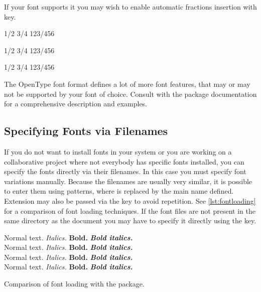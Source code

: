 If your font supports it you may wish to enable automatic fractions insertion
with  key.
\begin{example}
1/2 3/4 123/456

\setmainfont[
  Fractions=On,
]{Latin Modern Roman}
1/2 3/4 123/456

\setmainfont[
  Fractions=On,
]{Source Serif Pro}
1/2 3/4 123/456
\end{example}

The OpenType font format defines a lot of more font features, that may or may not
be supported by your font of choice. Consult with the  package
documentation for a comprehensive description and examples.

\subsection{Specifying Fonts via Filenames}\label{ssec:fonts_filename}

If you do not want to install fonts in your system or you are working on a
collaborative project where not everybody has specific fonts installed, you can
specify the fonts directly via their filenames. In this case you must specify
font variations manually. Because the filenames are usually very similar, it is
possible to enter them using \cargv{*} patterns, where \cargv{*} is replaced by
the main name defined. Extension may also be passed via the 
key to avoid repetition. See \autoref{lst:fontloading} for a comparison of font
loading techniques. If the font files are not present in the same directory as
the document you may have to specify it directly using the  key.
\begin{listing}
  \begin{example}[vertical_mode, examplewidth=0.8\linewidth]
\setmainfont{Source Serif Pro}
Normal text. \textit{Italics.} \textbf{Bold.}
\textit{\textbf{Bold italics.}} \\

\setmainfont{SourceSerifPro-Regular.otf}
Normal text. \textit{Italics.} \textbf{Bold.}
\textit{\textbf{Bold italics.}} \\
 
\setmainfont[
  ItalicFont=SourceSerifPro-RegularIt.otf,
  BoldFont=SourceSerifPro-Bold.otf,
  BoldItalicFont=SourceSerifPro-BoldIt.otf,
]{SourceSerifPro-Regular.otf}
Normal text. \textit{Italics.} \textbf{Bold.}
\textit{\textbf{Bold italics.}} \\

\setmainfont[
  Extension=.otf,
  UprightFont=*-Regular,
  ItalicFont=*-RegularIt,
  BoldFont=*-Bold,
  BoldItalicFont=*-BoldIt,
]{SourceSerifPro}
Normal text. \textit{Italics.} \textbf{Bold.}
\textit{\textbf{Bold italics.}}
\end{example}
  \caption{Comparison of font loading with the 
    package.}\label{lst:fontloading}
\end{listing}

